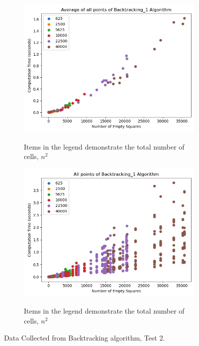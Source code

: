 \documentclass{article}
\begin{document}
\begin{figure}[!h]
	\centering
	\begin{subfigure}{0.4\textwidth}
		\centering
		\includegraphics[scale=0.4]{scatter_avg_Backtracking_1-2.png}
		\label{Test 2: Average of all points}
		\caption{Items in the legend demonstrate the total number of cells, $n^2$}
	\end{subfigure}
	\hfill
	\begin{subfigure}{0.4\textwidth}
		\centering
		\includegraphics[scale=0.4]{scatter_Backtracking_1-2.png}
		\label{Test 2: Scatter plot of all collected points}
		\caption{Items in the legend demonstrate the total number of cells, $n^2$}
	\end{subfigure}
	\caption{Data Collected from Backtracking algorithm, Test 2.}
\end{figure}
\end{document}
